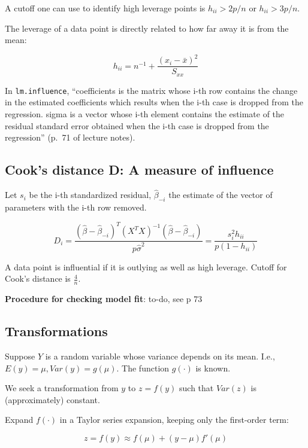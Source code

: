 A cutoff one can use to identify high leverage points is $h_{ii} > 2p/n$ or $h_{ii} > 3p/n$.

The leverage of a data point is directly related to how far away it is from the mean:

\begin{equation}
h_{ii} = n^{-1} + \frac{(x_i - \bar{x})^2}{S_{xx}}
\end{equation}

In \texttt{lm.influence}, ``coefficients is the matrix whose i-th row contains the change in the estimated coefficients which results when the i-th case is dropped from the regression. sigma is a vector whose i-th element contains the estimate of the residual standard error obtained when the i-th case is dropped from the regression'' (p.\ 71 of lecture notes).

\subsection{Cook's distance D: A measure of influence}

Let $s_i$ be the i-th standardized residual, $\hat{\beta}_{-i}$ the estimate of the vector of parameters with the i-th row removed.

\begin{equation}
D_i =  \frac{(\hat{\beta}-\hat{\beta}_{-i})^T(X^T X)^{-1}(\hat{\beta}-\hat{\beta}_{-i})}{p\hat{\sigma}^2} = \frac{s_i^2 h_{ii}}{p(1-h_{ii})}
\end{equation}

A data point is influential if it is outlying as well as high leverage. Cutoff for Cook's distance is $\frac{4}{n}$.

\textbf{Procedure for checking model fit}:
to-do, see p 73

\subsection{Transformations}

Suppose $Y$ is a random variable whose variance depends on its mean. I.e., $E(y)=\mu, Var(y)=g(\mu)$.
The function $g(\cdot)$ is known.

We seek a transformation from $y$ to $z = f(y)$ such that $Var(z)$ is (approximately) constant. 

Expand $f(\cdot)$ in a Taylor series expansion, keeping only the first-order term:

\begin{equation}
z= f(y)\approx f(\mu) + (y-\mu)f'(\mu)
\end{equation}

